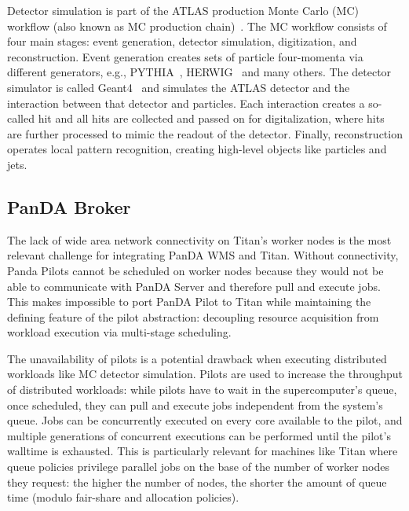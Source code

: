Detector simulation is part of the ATLAS production Monte Carlo (MC) workflow
(also known as MC production
chain)~\cite{rimoldi2006atlas,de2013delphes,ritsch2014atlas}. The MC workflow
consists of four main stages: event generation, detector simulation,
digitization, and reconstruction. Event generation creates sets of particle
four-momenta via different generators, e.g., PYTHIA~\cite{sjostrand2006pythia},
HERWIG~\cite{corcella2001herwig} and many others. The detector simulator is
called Geant4~\cite{agostinelli2003geant4} and simulates the ATLAS detector and
the interaction between that detector and particles. Each interaction creates a
so-called hit and all hits are collected and passed on for digitalization, where
hits are further processed to mimic the readout of the detector. Finally,
reconstruction operates local pattern recognition, creating high-level objects
like particles and jets.

\subsection{PanDA Broker}
\label{ssec:panda_titan}

The lack of wide area network connectivity on Titan's worker nodes is the most
relevant challenge for integrating PanDA WMS and Titan. Without connectivity,
Panda Pilots cannot be scheduled on worker nodes because they would not be able
to communicate with PanDA Server and therefore pull and execute jobs. This makes
impossible to port PanDA Pilot to Titan while maintaining the defining feature
of the pilot abstraction: decoupling resource acquisition from workload
execution via multi-stage scheduling.

The unavailability of pilots is a potential drawback when executing distributed
workloads like MC detector simulation. Pilots are used to increase the
throughput of distributed workloads: while pilots have to wait in the
supercomputer's queue, once scheduled, they can pull and execute jobs
independent from the system's queue. Jobs can be concurrently executed on
every core available to the pilot, and multiple generations of concurrent
executions can be performed until the pilot's walltime is exhausted. This is
particularly relevant for machines like Titan where queue policies privilege
parallel jobs on the base of the number of worker nodes they request: the higher
the number of nodes, the shorter the amount of queue time (modulo fair-share and
allocation policies).

